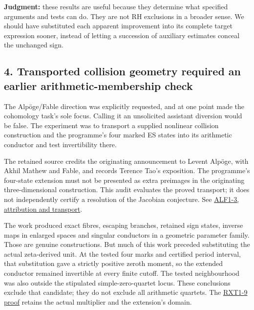 \documentclass[
  british,
  11pt,
  a4paper,
]{article}
\begin{document}
\textbf{Judgment:} these results are useful because they determine what
specified arguments and tests can do. They are not RH exclusions in a
broader sense. We should have substituted each apparent improvement into
its complete target expression sooner, instead of letting a succession
of auxiliary estimates conceal the unchanged sign.

\subsection{4. Transported collision geometry required an earlier
arithmetic-membership
check}\label{transported-collision-geometry-required-an-earlier-arithmetic-membership-check}

The Alpöge/Fable direction was explicitly requested, and at one point
made the cohomology task's sole focus. Calling it an unsolicited
assistant diversion would be false. The experiment was to transport a
supplied nonlinear collision construction and the programme's four
marked ES states into its arithmetic conductor and test invertibility
there.

The retained source credits the originating announcement to Levent
Alpöge, with Akhil Mathew and Fable, and records Terence Tao's
exposition. The programme's four-state extension must not be presented
as extra preimages in the originating three-dimensional construction.
This audit evaluates the proved transport; it does not independently
certify a resolution of the Jacobian conjecture. See
\href{https://github.com/KokunoYumeto/zeta-function-research-reader/blob/39ced92952a9c807d51500783b221beb141da3b6/workbenches/splitzero-tandem/continuations/20260921-actual-xi-uniform/ALPOGE_FABLE_ROLE.tex\#L5}{ALF1-3,
attribution and transport}.

The work produced exact fibres, escaping branches, retained sign states,
inverse maps in enlarged spaces and singular conductors in a geometric
parameter family. Those are genuine constructions. But much of this work
preceded substituting the actual zeta-derived unit. At the tested four
marks and certified period interval, that substitution gave a strictly
positive zeroth moment, so the extended conductor remained invertible at
every finite cutoff. The tested neighbourhood was also outside the
stipulated simple-zero-quartet locus. These conclusions exclude that
candidate; they do not exclude all arithmetic quartets. The
\href{https://github.com/KokunoYumeto/zeta-function-research-reader/blob/39ced92952a9c807d51500783b221beb141da3b6/workbenches/splitzero-tandem/continuations/20260921-actual-xi-uniform/ACTUAL_XI_UNIFORM_CONDUCTOR.tex\#L773}{RXT1-9
proof} retains the actual multiplier and the extension's domain.
\end{document}
